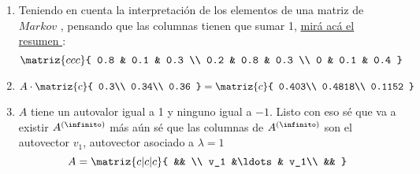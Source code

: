 \begin{enumerate}[label=(\alph*)]
  \item  Teniendo en cuenta la interpretación de los elementos de una matriz de $Markov$ , pensando
        que las columnas tienen que sumar 1, \hyperlink{teoria-4:markov}{mirá acá el resumen \click}:
        $$
          \matriz{ccc}{
            0.8 & 0.1 & 0.3 \\
            0.2 & 0.8 & 0.3 \\
            0 & 0.1 & 0.4
          }
        $$

  \item $$
          A \cdot
          \matriz{c}{
            0.3\\
            0.34\\
            0.36
          }
          =
          \matriz{c}{
            0.403\\
            0.4818\\
            0.1152
          }
        $$

  \item $A$ tiene un autovalor igual a 1 y ninguno igual a $-1$. Listo con eso sé que va a existir $A^{(\infinito)}$
        más aún sé que las columnas de $A^{(\infinito)}$ son el autovector $v_1$, autovector asociado a $\lambda = 1$
        $$
          A =
          \matriz{c|c|c}{
            &&  \\
            v_1 &\ldots&  v_1\\
            &&
          }
        $$
\end{enumerate}
